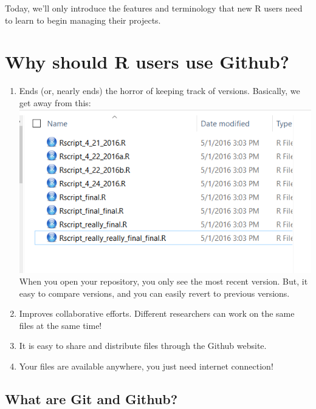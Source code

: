 \documentclass[]{book}
\providecommand{\tightlist}{%
  \setlength{\itemsep}{0pt}\setlength{\parskip}{0pt}}
\begin{document}
Today, we'll only introduce the features and terminology that new R users need to learn to begin managing their projects.

\hypertarget{why-should-r-users-use-github}{%
\section{Why should R users use Github?}\label{why-should-r-users-use-github}}

\begin{enumerate}
\def\labelenumi{\arabic{enumi}.}
\tightlist
\item
  Ends (or, nearly ends) the horror of keeping track of versions.
  Basically, we get away from this:
  \includegraphics{img/MessySaves.png}
  When you open your repository, you only see the most recent version. But, it easy to compare versions, and you can easily revert to previous versions.
\item
  Improves collaborative efforts. Different researchers can work on the same files at the same time!
\item
  It is easy to share and distribute files through the Github website.
\item
  Your files are available anywhere, you just need internet connection!
\end{enumerate}

\hypertarget{what-are-git-and-github}{%
\subsection{What are Git and Github?}\label{what-are-git-and-github}}
\end{document}
